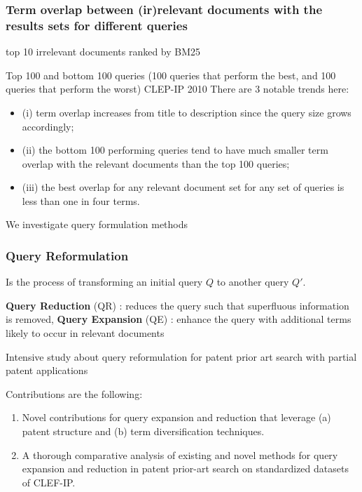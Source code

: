 \documentclass[xcolor=dvipsnames]{beamer}
\begin{document}
\begin{frame}
\frametitle{Term overlap between (ir)relevant documents with the results sets 
for different queries}

top 10 irrelevant documents ranked by BM25~\cite{Robertson1993}

Top 100 and bottom 100 queries (100 queries that perform the best, and 100 queries that perform the worst) CLEP-IP 2010 
There are 3 notable trends here: 
\begin{itemize}
\item[] 	(i) term overlap increases from title to description
since the query size grows accordingly; 
\item[]	(ii) the bottom 100 performing queries tend to have much smaller term overlap with the relevant documents than the top 100 queries; 
\item[]	(iii) the best overlap for any relevant
document set for any set of queries is less than one in four terms.
\end{itemize}
We investigate query formulation methods
\end{frame}



\begin{frame}
\frametitle{Query Reformulation}

Is the process of transforming an initial query $Q$ to another query $Q'$. 

\textbf{Query Reduction} (QR) \cite{Kumaran2009}: reduces the query such that superfluous information is removed,
\textbf{Query Expansion} (QE) \cite{Efthimiadis1996}: enhance the query with
additional terms likely to occur in relevant documents

Intensive study about query reformulation for patent
prior art search with partial patent applications

Contributions are the following: 
\begin{enumerate}
\item Novel contributions for query expansion and reduction that leverage
(a) patent structure and (b) term diversification techniques. 
\item A thorough comparative analysis of existing and novel methods for
query expansion and reduction in patent prior-art search on standardized
datasets of CLEF-IP. 
\end{enumerate}
\end{frame}
\end{document}
